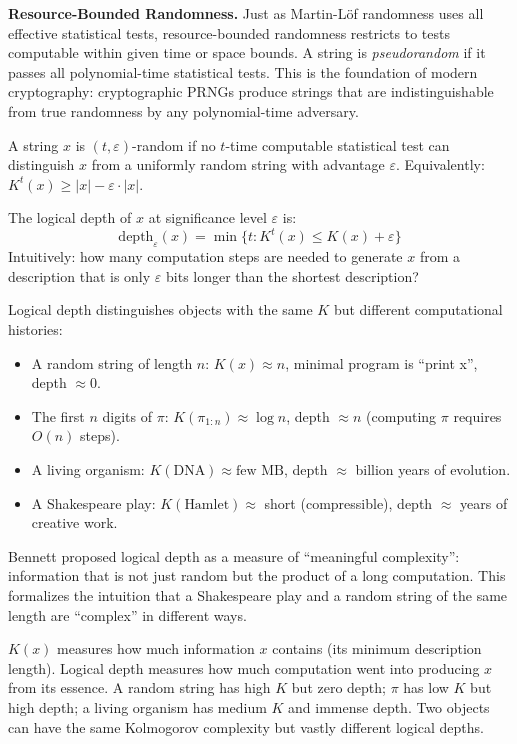 \textbf{Resource-Bounded Randomness.} Just as Martin-L\"of randomness uses all effective statistical tests, resource-bounded randomness restricts to tests computable within given time or space bounds. A string is \emph{pseudorandom} if it passes all polynomial-time statistical tests. This is the foundation of modern cryptography: cryptographic PRNGs produce strings that are indistinguishable from true randomness by any polynomial-time adversary.

\begin{definition}
A string $x$ is $(t,\varepsilon)$-random if no $t$-time computable statistical test can distinguish $x$ from a uniformly random string with advantage $\varepsilon$. Equivalently: $K^t(x) \ge |x| - \varepsilon \cdot |x|$.
\end{definition}

\begin{definition}
The logical depth of $x$ at significance level $\varepsilon$ is:
\[
\text{depth}_\varepsilon(x) = \min \{ t : K^t(x) \le K(x) + \varepsilon \}
\]
Intuitively: how many computation steps are needed to generate $x$ from a description that is only $\varepsilon$ bits longer than the shortest description?
\end{definition}

Logical depth distinguishes objects with the same $K$ but different computational histories:
\begin{itemize}
\item A random string of length $n$: $K(x) \approx n$, minimal program is ``print x'', depth $\approx 0$.
\item The first $n$ digits of $\pi$: $K(\pi_{1:n}) \approx \log n$, depth $\approx n$ (computing $\pi$ requires $O(n)$ steps).
\item A living organism: $K(\text{DNA}) \approx \text{few MB}$, depth $\approx$ billion years of evolution.
\item A Shakespeare play: $K(\text{Hamlet}) \approx$ short (compressible), depth $\approx$ years of creative work.
\end{itemize}

Bennett proposed logical depth as a measure of ``meaningful complexity'': information that is not just random but the product of a long computation. This formalizes the intuition that a Shakespeare play and a random string of the same length are ``complex'' in different ways.

$K(x)$ measures how much information $x$ contains (its minimum description length). Logical depth measures how much computation went into producing $x$ from its essence. A random string has high $K$ but zero depth; $\pi$ has low $K$ but high depth; a living organism has medium $K$ and immense depth. Two objects can have the same Kolmogorov complexity but vastly different logical depths.

